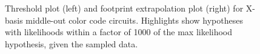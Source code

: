 \documentclass[onecolumn,unpublished,a4paper]{quantumarticle}
\theoremstyle{definition}
\theoremstyle{definition}
\theoremstyle{definition}
\begin{document}
\begin{figure}
    \centering
    \hfill
    \caption{
        Threshold plot (left) and footprint extrapolation plot (right) for X-basis middle-out color code circuits.
        Highlights show hypotheses with likelihoods within a factor of 1000 of the max likelihood hypothesis, given the sampled data.
    }
    \label{fig:midout-x}
\end{figure}
\end{document}
